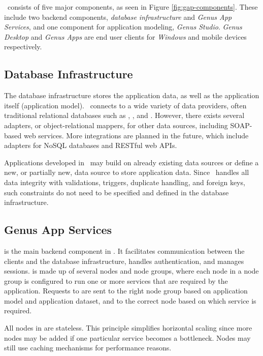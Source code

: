 \gap~consists of five major components, as seen in Figure \ref{fig:gap-components}. These include two backend components, \textit{database infrastructure} and \textit{Genus App Services}, and one component for application modeling, \textit{Genus Studio}. \textit{Genus Desktop} and \textit{Genus Apps} are end user clients for \textit{Windows} and mobile devices respectively.

\subsection{Database Infrastructure}
\label{sub:Database Infrastructure}

The database infrastructure stores the application data, as well as the application itself (application model). \gap~connects to a wide variety of data providers, often traditional relational databases such as , , and . However, there exists several adapters, or object-relational mappers, for other data sources, including SOAP-based web services. More integrations are planned in the future, which include adapters for NoSQL databases and RESTful web APIs. 

Applications developed in \gap~may build on already existing data sources or define a new, or partially new, data source to store application data. Since \gap~handles all data integrity with validations, triggers, duplicate handling, and foreign keys, such constraints do not need to be specified and defined in the database infrastructure.


\subsection{Genus App Services}
\label{sub:Genus App Services}
 is the main backend component in \gap. It facilitates communication between the clients and the database infrastructure, handles authentication, and manages sessions.  is made up of several nodes and node groups, where each node in a node group is configured to run one or more services that are required by the application. Requests to  are sent to the right node group based on application model and application dataset, and to the correct node based on which service is required. 

All nodes in  are stateless. This principle simplifies horizontal scaling since more nodes may be added if one particular service becomes a bottleneck. Nodes may still use caching mechanisms for performance reasons.

